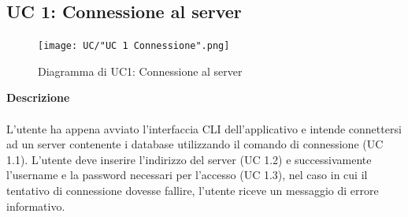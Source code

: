 \documentclass[a4paper]{article}
\begin{document}
	 \subsection{UC 1: Connessione al server}
	 \begin{figure}[H]
				\centering
				\texttt{[image: UC/"UC 1 Connessione".png]}
				\caption{Diagramma di UC1: Connessione al server}
			\end{figure}
	\textbf{Descrizione} 
	\\ \\
	L'utente ha appena avviato l'interfaccia CLI dell'applicativo e intende connettersi ad un server contenente i database utilizzando il comando di connessione (UC 1.1). L'utente deve inserire l'indirizzo del server (UC 1.2) e successivamente l'username e la password necessari per l'accesso (UC 1.3), nel caso in cui il tentativo di connessione dovesse fallire, l'utente riceve un messaggio di errore informativo.
\end{document}
